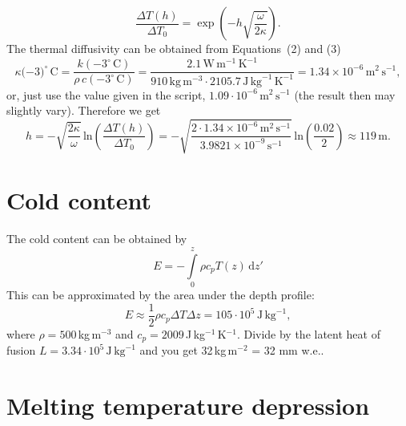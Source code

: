 \documentclass[DIV15,11pt,parskip=half]{scrartcl}
\newcommand{\unit}[1]{\ensuremath{\,\mathrm{#1}}}
\newcommand{\cels}[1]{\ensuremath{#1^{\circ}\,\mathrm{C}}}
\begin{document}
 \begin{equation*}
   \label{eq:temp-depth-amplitude}
   \frac{\Delta T(h)}{\Delta T_0}= \exp\left(-h \sqrt{\frac{\omega}{2\kappa}}\right).
 \end{equation*} The thermal diffusivity can be obtained from Equations~(2) and (3)
\begin{equation*}
\kappa(-\cels{3)} = \frac{k(-\cels{3})}{\rho\,c(-\cels{3})} = \frac{2.1\,\text{W}\,\text{m}^{-1}\,\text{K}^{-1}}{910\,\text{kg}\,\text{m}^{-3} \cdot 2105.7\,\text{J}\,\text{kg}^{-1}\,\text{K}^{-1}} = 1.34\times 10^{-6}\,\text{m}^{2}\,\text{s}^{-1}, 
\end{equation*} or, just use the value given in the script, $1.09\cdot 10^{-6}\unit{m}^{2}\unit{s}^{-1}$ (the result then may slightly vary).
Therefore we get
\begin{equation*}
  h = -\sqrt{\frac{2\kappa}{\omega}}\,\text{ln}\left(\frac{\Delta T(h)}{\Delta T_0}\right)
  = - \sqrt{\frac{2\cdot 1.34\times 10^{-6}\,\text{m}^{2}\,\text{s}^{-1}}{3.9821\times 10^{-9}\,\text{s}^{-1}}}\,\text{ln}\left( \frac{0.02}{2}\right) \approx 119\,\text{m}.
\end{equation*}

\section{Cold content}
 
The cold content can be obtained by
\begin{equation*}
E = -\int \limits_0^z \rho c_p T(z) \,\mathrm{d} z'
\end{equation*}
This can be approximated by the area under the depth profile:
\begin{equation*}
E \approx \frac{1}{2}\rho c_p\Delta T\Delta z = 105 \cdot 10^5\,\mathrm{J\,kg}^{-1},
\end{equation*} where $\rho=500\,$kg\,m$^{-3}$ and $c_p=2009$\,J\,kg$^{-1}$\,K$^{-1}$.
Divide by the latent heat of fusion $L=3.34\cdot10^5\,\mathrm{J\,kg}^{-1}$ and you get 32\,kg\,m$^{-2}$ = 32 mm w.e..


\section{Melting temperature depression}
\end{document}
